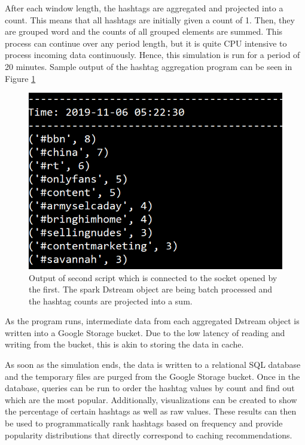 \documentclass[conference]{IEEEtran}
\begin{document}
After each window length, the hashtags are aggregated and projected into a count. This means that all hashtags are initially given a count of 1. Then, they are grouped word and the counts of all grouped elements are summed. This process can continue over any period length, but it is quite CPU intensive to process incoming data continuously. Hence, this simulation is run for a period of 20 minutes. Sample output of the hashtag aggregation program can be seen in Figure \ref{fig:hashtag_aggregation} \par

\begin{figure}
    \centering
    \includegraphics[scale=1.0]{img/hashtag_aggregation.PNG}
    \caption{Output of second script which is connected to the socket opened by the first. The spark Dstream object are being batch processed and the hashtag counts are projected into a sum.}
    \label{fig:hashtag_aggregation}
\end{figure}

As the program runs, intermediate data from each aggregated Dstream object is written into a Google Storage bucket. Due to the low latency of reading and writing from the bucket, this is akin to storing the data in cache. \par

As soon as the simulation ends, the data is written to a relational SQL database and the temporary files are purged from the Google Storage bucket. Once in the database, queries can be run to order the hashtag values by count and find out which are the most popular. Additionally, visualizations can be created to show the percentage of certain hashtags as well as raw values. These results can then be used to programmatically rank hashtags based on frequency and provide popularity distributions that directly correspond to caching recommendations. \par
\end{document}
